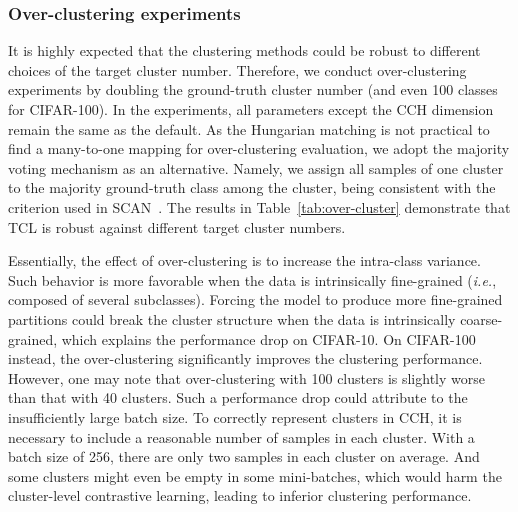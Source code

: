\subsubsection{Over-clustering experiments}
It is highly expected that the clustering methods could be robust to different choices of the target cluster number. Therefore, we conduct over-clustering experiments by doubling the ground-truth cluster number (and even 100 classes for CIFAR-100). In the experiments, all parameters except the CCH dimension remain the same as the default. As the Hungarian matching is not practical to find a many-to-one mapping for over-clustering evaluation, we adopt the majority voting mechanism as an alternative. Namely, we assign all samples of one cluster to the majority ground-truth class among the cluster, being consistent with the criterion used in SCAN~\citep{SCAN}. The results in Table~\ref{tab:over-cluster} demonstrate that TCL is robust against different target cluster numbers.

\begin{table}[!h]
\centering
\caption{The robustness of TCL against different choices of the target cluster number.}
\label{tab:over-cluster}
\end{table}

Essentially, the effect of over-clustering is to increase the intra-class variance. Such behavior is more favorable when the data is intrinsically fine-grained (\textit{i.e.}, composed of several subclasses). Forcing the model to produce more fine-grained partitions could break the cluster structure when the data is intrinsically coarse-grained, which explains the performance drop on CIFAR-10. On CIFAR-100 instead, the over-clustering significantly improves the clustering performance. However, one may note that over-clustering with 100 clusters is slightly worse than that with 40 clusters. Such a performance drop could attribute to the insufficiently large batch size. To correctly represent clusters in CCH, it is necessary to include a reasonable number of samples in each cluster. With a batch size of 256, there are only two samples in each cluster on average. And some clusters might even be empty in some mini-batches, which would harm the cluster-level contrastive learning, leading to inferior clustering performance.

